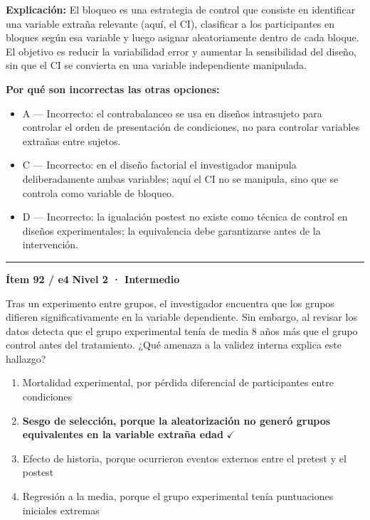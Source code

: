 \documentclass[12pt,a4paper]{article}
\begin{document}
\noindent\textbf{\color{azul}Explicación:} El bloqueo es una estrategia de control que consiste en identificar una variable extraña relevante (aquí, el CI), clasificar a los participantes en bloques según esa variable y luego asignar aleatoriamente dentro de cada bloque. El objetivo es reducir la variabilidad error y aumentar la sensibilidad del diseño, sin que el CI se convierta en una variable independiente manipulada.

\noindent\textbf{\color{gris}Por qué son incorrectas las otras opciones:}
\begin{itemize}
  \item {\small A — Incorrecto: el contrabalanceo se usa en diseños intrasujeto para controlar el orden de presentación de condiciones, no para controlar variables extrañas entre sujetos.}
  \item {\small C — Incorrecto: en el diseño factorial el investigador manipula deliberadamente ambas variables; aquí el CI no se manipula, sino que se controla como variable de bloqueo.}
  \item {\small D — Incorrecto: la igualación postest no existe como técnica de control en diseños experimentales; la equivalencia debe garantizarse antes de la intervención.}
\end{itemize}
\vspace{8pt}\hrule\vspace{10pt}

\begin{mdframed}[backgroundcolor=fondogris,linecolor=ambar,linewidth=1pt,innerleftmargin=10pt,innerrightmargin=10pt,innertopmargin=7pt,innerbottommargin=7pt]
\textbf{Ítem 92 / e4} \hfill {\small\bfseries\color{ambar} Nivel 2 · Intermedio}
\end{mdframed}

Tras un experimento entre grupos, el investigador encuentra que los grupos difieren significativamente en la variable dependiente. Sin embargo, al revisar los datos detecta que el grupo experimental tenía de media 8 años más que el grupo control antes del tratamiento. ¿Qué amenaza a la validez interna explica este hallazgo?

\begin{enumerate}
  \item[A.] Mortalidad experimental, por pérdida diferencial de participantes entre condiciones
  \item[\textbf{\color{verde}B.}] \textbf{\color{verde} Sesgo de selección, porque la aleatorización no generó grupos equivalentes en la variable extraña edad} \hfill $\checkmark$
  \item[C.] Efecto de historia, porque ocurrieron eventos externos entre el pretest y el postest
  \item[D.] Regresión a la media, porque el grupo experimental tenía puntuaciones iniciales extremas
\end{enumerate}
\end{document}
